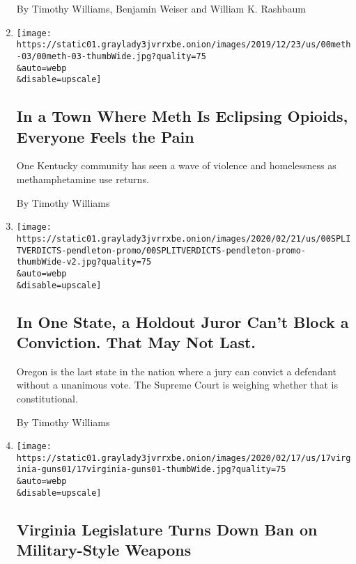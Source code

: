 \begin{enumerate}
  By Timothy Williams, Benjamin Weiser and William K. Rashbaum
\item
  \href{/2020/03/28/us/methamphetamine-kentucky-effects.html}{}

  \texttt{[image: https://static01.graylady3jvrrxbe.onion/images/2019/12/23/us/00meth-03/00meth-03-thumbWide.jpg?quality=75\\\&auto=webp\\\&disable=upscale]}

  \hypertarget{in-a-town-where-meth-is-eclipsing-opioids-everyone-feels-the-pain}{%
  \subsection{In a Town Where Meth Is Eclipsing Opioids, Everyone Feels
  the
  Pain}\label{in-a-town-where-meth-is-eclipsing-opioids-everyone-feels-the-pain}}

  One Kentucky community has seen a wave of violence and homelessness as
  methamphetamine use returns.

  By Timothy Williams
\item
  \href{/2020/02/23/us/oregon-court-case-verdicts.html}{}

  \texttt{[image: https://static01.graylady3jvrrxbe.onion/images/2020/02/21/us/00SPLITVERDICTS-pendleton-promo/00SPLITVERDICTS-pendleton-promo-thumbWide-v2.jpg?quality=75\\\&auto=webp\\\&disable=upscale]}

  \hypertarget{in-one-state-a-holdout-juror-cant-block-a-conviction-that-may-not-last}{%
  \subsection{In One State, a Holdout Juror Can't Block a Conviction.
  That May Not
  Last.}\label{in-one-state-a-holdout-juror-cant-block-a-conviction-that-may-not-last}}

  Oregon is the last state in the nation where a jury can convict a
  defendant without a unanimous vote. The Supreme Court is weighing
  whether that is constitutional.

  By Timothy Williams
\item
  \href{/2020/02/17/us/Virginia-assault-weapons-legislature.html}{}

  \texttt{[image: https://static01.graylady3jvrrxbe.onion/images/2020/02/17/us/17virginia-guns01/17virginia-guns01-thumbWide.jpg?quality=75\\\&auto=webp\\\&disable=upscale]}

  \hypertarget{virginia-legislature-turns-down-ban-on-military-style-weapons}{%
  \subsection{Virginia Legislature Turns Down Ban on Military-Style
  Weapons}\label{virginia-legislature-turns-down-ban-on-military-style-weapons}}


\end{enumerate}
